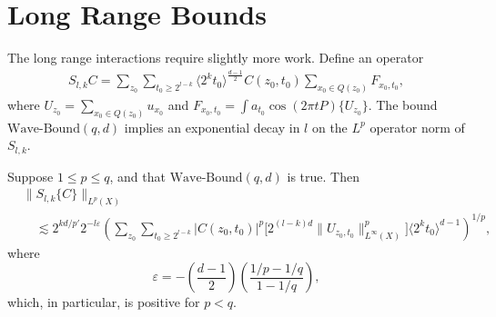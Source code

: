 \section{Long Range Bounds}

The long range interactions require slightly more work. Define an operator
%
\begin{align*}
    S_{l,k} C = \sum\nolimits_{z_0} \sum\nolimits_{t_0 \geq 2^{l-k}} \langle 2^k t_0 \rangle^{\frac{d-1}{2}} C(z_0,t_0) \sum\nolimits_{x_0 \in Q(z_0)} F_{x_0,t_0},
\end{align*}
%
where $U_{z_0} = \sum_{x_0 \in Q(z_0)} u_{x_0}$ and $F_{x_0,t_0} = \int a_{t_0} \cos(2 \pi t P) \{ U_{z_0} \}$. The bound $\text{Wave-Bound}(q,d)$ implies an exponential decay in $l$ on the $L^p$ operator norm of $S_{l,k}$.

\begin{lemma} \label{lemma:scaleupbound}
    Suppose $1 \leq p \leq q$, and that $\text{Wave-Bound}(q,d)$ is true. Then
    \begin{align*}
        &\| S_{l,k} \{ C \} \|_{L^p(X)}\\
        &\quad \lesssim 2^{kd/p'} 2^{- l \varepsilon} \left( \sum\nolimits_{z_0} \sum\nolimits_{t_0 \geq 2^{l-k}} |C(z_0,t_0)|^p \big[ 2^{(l-k)d} \| U_{z_0,t_0} \|_{L^\infty(X)}^p \big] \langle 2^k t_0 \rangle^{d-1} \right)^{1/p},
    \end{align*}
    where
    \[ \varepsilon = - \left( \frac{d-1}{2} \right) \left( \frac{1/p - 1/q}{1 - 1/q} \right), \]
    which, in particular, is positive for $p < q$.
\end{lemma}
